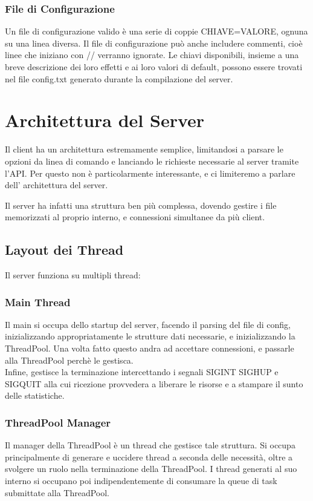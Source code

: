 \documentclass[11pt]{article}
\begin{document}
\begin{flushleft}
\subsubsection{File di Configurazione}

Un file di configurazione valido è una serie di coppie CHIAVE=VALORE, ognuna su una linea diversa.
Il file di configurazione può anche includere commenti, cioè linee che iniziano con // verranno ignorate. Le chiavi disponibili, insieme a una breve descrizione dei loro effetti e ai loro valori di default, possono essere trovati nel file config.txt generato durante la compilazione del server.

\section{Architettura del Server}

Il client ha un architettura estremamente semplice, limitandosi a parsare le opzioni da linea di comando e lanciando le richieste necessarie al server tramite l'API. Per questo non è particolarmente interessante, e ci limiteremo a parlare dell' architettura del server.

Il server ha infatti una struttura ben più complessa, dovendo gestire i file memorizzati al proprio interno, e connessioni simultanee da più client. 

\subsection{Layout dei Thread}
Il server funziona su multipli thread:

\subsubsection{Main Thread}
Il main si occupa dello startup del server, facendo il parsing del file di config, inizializzando appropriatamente le strutture dati necessarie, e inizializzando la ThreadPool. Una volta fatto questo andra ad accettare connessioni, e passarle alla ThreadPool perchè le gestisca.
\\Infine, gestisce la terminazione intercettando i segnali SIGINT SIGHUP e SIGQUIT alla cui ricezione provvedera a liberare le risorse e a stampare il sunto delle statistiche.

\subsubsection{ThreadPool Manager}
Il manager della ThreadPool è un thread che gestisce tale struttura. Si occupa principalmente di generare e uccidere thread a seconda delle necessità, oltre a svolgere un ruolo nella terminazione della ThreadPool. I thread generati al suo interno si occupano poi indipendentemente di consumare la queue di task submittate alla ThreadPool.


\end{flushleft}
\end{document}
